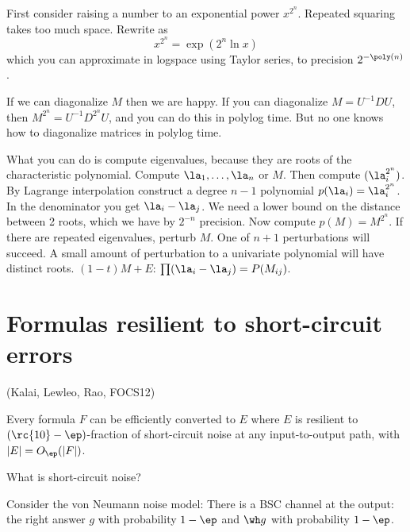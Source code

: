 First consider raising a number to an exponential power $x^{2^n}$. Repeated squaring takes too much space. Rewrite as
\[
x^{2^n} = \exp(2^n\ln x)
\]
which you can approximate in logspace using Taylor series, to precision $2^{-\poly(n)}$. 

If we can diagonalize $M$ then we are happy.
If you can diagonalize $M=U^{-1}DU$, then $M^{2^n}=U^{-1}D^{2^n}U$, and you can do this in polylog time. But no one knows how to diagonalize matrices in polylog time.

What you can do is compute eigenvalues, because they are roots of the characteristic polynomial. Compute $\la_1,\ldots, \la_n$ or $M$. 
Then compute $(\la_i^{2^n})$. By Lagrange interpolation construct a degree $n-1$ polynomial $p(\la_i)= \la_i^{2^n}$.
In the denominator you get $\la_i-\la_j$. We need a lower bound on the distance between 2 roots, which we have by $2^{-n}$ precision. Now compute $p(M)=M^{2^n}$.
If there are repeated eigenvalues, perturb $M$. One of $n+1$ perturbations will succeed. A small amount of perturbation to a univariate polynomial will have distinct roots. $(1-t)M+E$: $\prod (\la_i-\la_j)=P(M_{ij})$. 


\section{Formulas resilient to short-circuit errors}

(Kalai, Lewleo, Rao, FOCS12)

\begin{thm}
Every formula $F$ can be efficiently converted to $E$ where $E$ is resilient to $(\rc{10}-\ep)$-fraction of short-circuit noise at any input-to-output path, with $|E|=O_\ep(|F|)$.
\end{thm}

What is short-circuit noise?

Consider the von Neumann noise model: There is a BSC channel at the output: the right answer $g$ with probability $1-\ep$ and $\wh g $ with probability $1-\ep$. 

